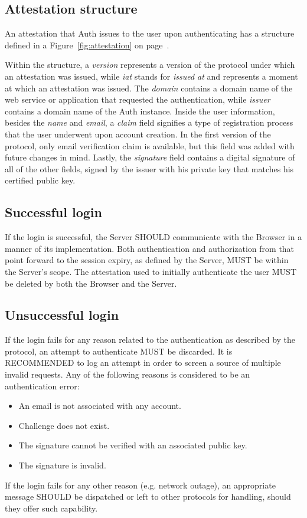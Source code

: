     \subsection{Attestation structure}
    An attestation that Auth issues to the user upon authenticating has a structure defined in a Figure~\ref{fig:attestation}
    on page~\pageref{fig:attestation}.
    
    Within the structure, a \textit{version} represents a version of the protocol under which an attestation was issued, 
    while \textit{iat} stands for \textit{issued at} and represents a moment at which an attestation was issued. The 
    \textit{domain} contains a domain name of the web service or application that requested the authentication, while 
    \textit{issuer} contains a domain name of the Auth instance. Inside the user information, besides the \textit{name}
    and \textit{email}, a \textit{claim} field signifies a type of registration process that the user underwent upon 
    account creation. In the first version of the protocol, only email verification claim is available, but this field 
    was added with future changes in mind. Lastly, the \textit{signature} field contains a digital signature of all of 
    the other fields, signed by the issuer with his private key that matches his certified public key. 

    \subsection{Successful login}
    If the login is successful, the Server SHOULD communicate with the Browser in a manner of its implementation. Both 
    authentication and authorization from that point forward to the session expiry, as defined by the Server, MUST be 
    within the Server's scope. The attestation used to initially authenticate the user MUST be deleted by both the Browser
    and the Server.

    \subsection{Unsuccessful login}
    If the login fails for any reason related to the authentication as described by the protocol, an attempt to 
    authenticate MUST be discarded. It is RECOMMENDED to log an attempt in order to screen a source of multiple invalid 
    requests. Any of the following reasons is considered to be an authentication error:
        \begin{itemize}
            \item An email is not associated with any account.
            \item Challenge does not exist.
            \item The signature cannot be verified with an associated public key.
            \item The signature is invalid.
        \end{itemize}
    If the login fails for any other reason (e.g. network outage), an appropriate message SHOULD be dispatched or left 
    to other protocols for handling, should they offer such capability.

        
